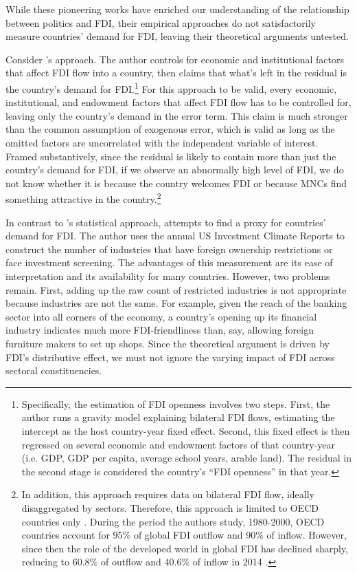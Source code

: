 While these pioneering works have enriched our understanding of the relationship
between politics and FDI, their empirical approaches do not satisfactorily
measure countries' demand for FDI, leaving their theoretical arguments untested.

Consider \citet{Pinto2013}'s approach. The author controls for economic and
institutional factors that affect FDI flow into a country, then claims that
what's left in the residual is the country's demand for
FDI.\footnote{Specifically, the estimation of FDI openness involves two steps.
  First, the author runs a gravity model explaining bilateral FDI flows,
  estimating the intercept as the host country-year fixed effect. Second, this
  fixed effect is then regressed on several economic and endowment factors of
  that country-year (i.e. GDP, GDP per capita, average school years, arable
  land). The residual in the second stage is considered the country's ``FDI
  openness'' in that year.} For this approach to be valid, every economic,
institutional, and endowment factors that affect FDI flow has to be controlled
for, leaving only the country's demand in the error term. This claim is much
stronger than the common assumption of exogenous error, which is valid as long
as the omitted factors are uncorrelated with the independent variable of
interest. Framed substantively, since the residual is likely to contain more
than just the country's demand for FDI, if we observe an abnormally high level
of FDI, we do not know whether it is because the country welcomes FDI or because
MNCs find something attractive in the country.\footnote{In addition, this
  approach requires data on bilateral FDI flow, ideally disaggregated by
  sectors. Therefore, this approach is limited to OECD countries only
  \citep{Pinto2008}. During the period the authors study, 1980-2000, OECD
  countries account for 95\% of global FDI outflow and 90\% of inflow. However,
  since then the role of the developed world in global FDI has declined sharply,
  reducing to 60.8\% of outflow and 40.6\% of inflow in 2014
  \citep{UNCTAD2015}.}

In contrast to \citet{Pinto2013}'s statistical approach, \citet{Pandya2014,
  Pandya2016} attempts to find a proxy for countries' demand for FDI. The author
uses the annual US Investment Climate Reports to construct the number of
industries that have foreign ownership restrictions or face investment
screening. The advantages of this measurement are its ease of interpretation and
its availability for many countries. However, two problems remain. First, adding
up the raw count of restricted industries is not appropriate because industries
are not the same. For example, given the reach of the banking sector into all
corners of the economy, a country's opening up its financial industry indicates
much more FDI-friendliness than, say, allowing foreign furniture makers to set
up shops. Since the theoretical argument is driven by FDI's distributive effect,
we must not ignore the varying impact of FDI across sectoral constituencies.

